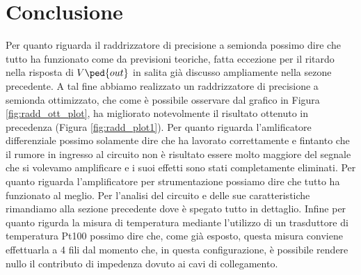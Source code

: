 \section*{Conclusione}

Per quanto riguarda il raddrizzatore di precisione a semionda possimo dire che tutto ha funzionato come da previsioni teoriche, fatta eccezione per il ritardo nella risposta di $V\ped{out}$ in salita già discusso ampliamente nella sezone precedente. A tal fine abbiamo realizzato un raddrizzatore di precisione a semionda ottimizzato, che come è possibile osservare dal grafico in Figura \ref{fig:radd_ott_plot}, ha migliorato notevolmente il risultato ottenuto in precedenza (Figura \ref{fig:radd_plot1}).
Per quanto riguarda l'amlificatore differenziale possimo solamente dire che ha lavorato correttamente e fintanto che il rumore in ingresso al circuito non è risultato essere molto maggiore del segnale che si volevamo amplificare e i suoi effetti sono stati completamente eliminati.
Per quanto riguarda l'amplificatore per strumentazione possiamo dire che tutto ha funzionato al meglio. Per l'analisi del circuito e delle sue caratteristiche rimandiamo alla sezione precedente dove è spegato tutto in dettaglio.
Infine per quanto rigurda la misura di temperatura mediante l'utilizzo di un trasduttore di temperatura Pt100 possimo dire che, come già esposto, questa misura conviene effettuarla a 4 fili dal momento che, in questa configurazione, è possibile rendere nullo il contributo di impedenza dovuto ai cavi di collegamento. 

